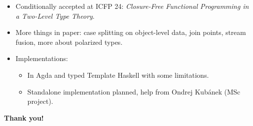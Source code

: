 \documentclass[dvipsnames,aspectratio=169]{beamer}
\theoremstyle{remark}
\begin{document}
\begin{frame}

\begin{itemize}
  \item Conditionally accepted at ICFP 24: \emph{Closure-Free Functional Programming in a Two-Level Type Theory}.
  \item More things in paper: case splitting on object-level data, join points,
    stream fusion, more about polarized types.
  \item Implementations:
    \begin{itemize}
      \item In Agda and typed Template Haskell with some limitations.
      \item Standalone implementation planned, help from Ondrej Kubánek (MSc project).
    \end{itemize}
\end{itemize}
\vspace{2em}

\begin{center}

  \Large{\textbf{Thank you!}}

\end{center}



\end{frame}
\end{document}
